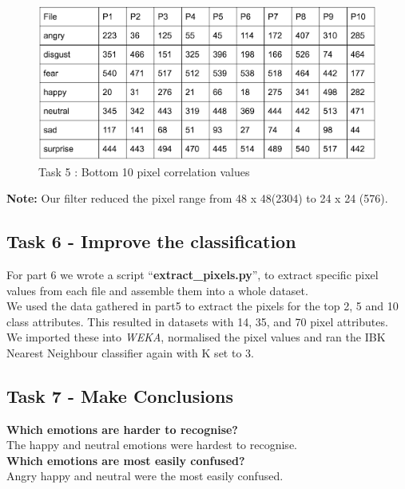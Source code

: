 \documentclass[12pt]{article}
\begin{document}
\begin{figure}[H]
	\centering
	\includegraphics[width=0.7\linewidth]{images/task5_results_2}
	\caption{Task 5 : Bottom 10 pixel correlation values}
	\label{fig:task5_results_2}
\end{figure}

\textbf{Note:} Our filter reduced the pixel range from 48 x 48(2304)  to 24 x 24 (576).

\subsection{Task 6 - Improve the classification}

For part 6 we wrote a script ``\textbf{extract\_pixels.py}'', to extract specific pixel values from each file and assemble them into a whole dataset.\\ 

We used the data gathered in part5 to extract the pixels for the top 2, 5 and 10 class attributes. This resulted in datasets with 14, 35, and 70 pixel attributes.\\

We imported these into \textit{WEKA}, normalised the pixel values and ran the IBK Nearest Neighbour classifier again with K set to 3.\\ 

\subsection{Task 7 - Make Conclusions}

\vspace{4mm}

\textbf{Which emotions are harder to recognise?}\\

The happy and neutral emotions were hardest to recognise.\\

\noindent\textbf{Which emotions are most easily confused?}\\

Angry happy and neutral were the most easily confused.\\
\end{document}
